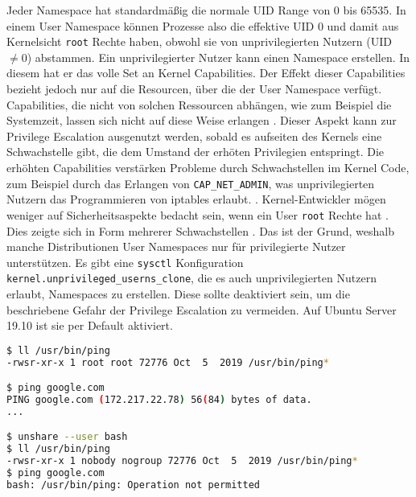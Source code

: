 Jeder Namespace hat standardmäßig die normale UID Range von 0 bis 65535. In einem User Namespace können Prozesse also die effektive UID 0 und damit aus Kernelsicht \texttt{root} Rechte haben, obwohl sie von unprivilegierten Nutzern (UID $\neq 0$) abstammen. Ein unprivilegierter Nutzer kann einen Namespace erstellen. In diesem hat er das volle Set an Kernel Capabilities. Der Effekt dieser Capabilities bezieht jedoch nur auf die Resourcen, über die der User Namespace verfügt. Capabilities, die
nicht von solchen Ressourcen abhängen, wie zum Beispiel die Systemzeit, lassen sich nicht auf diese Weise erlangen \cite{man-user-ns}.
Dieser Aspekt kann zur Privilege Escalation ausgenutzt werden, sobald es aufseiten des Kernels eine Schwachstelle gibt, die dem Umstand der erhöten Privilegien entspringt. Die erhöhten Capabilities verstärken Probleme durch Schwachstellen im Kernel Code, zum Beispiel durch das Erlangen von \texttt{CAP\_NET\_ADMIN}, was unprivilegierten Nutzern das Programmieren von iptables erlaubt. \cite{lwn-controlling-access}. Kernel-Entwickler mögen weniger auf Sicherheitsaspekte bedacht sein, wenn ein
User \texttt{root} Rechte hat \cite{kerrisk-anatomy}. Dies zeigte
sich in Form mehrerer Schwachstellen \cite{cve-2013-1858, cve-2014-5206, cve-2014-5207, cve-2016-3135, cve-2017-1000111}. Das ist der Grund, weshalb manche Distributionen User Namespaces nur für privilegierte Nutzer unterstützen. Es gibt eine \texttt{sysctl} Konfiguration \texttt{kernel.unprivileged\_userns\_clone}, die es auch unprivilegierten Nutzern erlaubt, Namespaces zu erstellen. Diese sollte deaktiviert sein, um die beschriebene Gefahr der Privilege Escalation
zu vermeiden. Auf Ubuntu Server 19.10 ist sie per Default aktiviert.

\begin{lstlisting}[language=sh,caption={Eliminieren von root-Setuid Vulnerabilities mithilfe von User Namespaces}]
$ ll /usr/bin/ping
-rwsr-xr-x 1 root root 72776 Oct  5  2019 /usr/bin/ping*

$ ping google.com
PING google.com (172.217.22.78) 56(84) bytes of data.
...

$ unshare --user bash
$ ll /usr/bin/ping
-rwsr-xr-x 1 nobody nogroup 72776 Oct  5  2019 /usr/bin/ping*
$ ping google.com
bash: /usr/bin/ping: Operation not permitted
\end{lstlisting}

